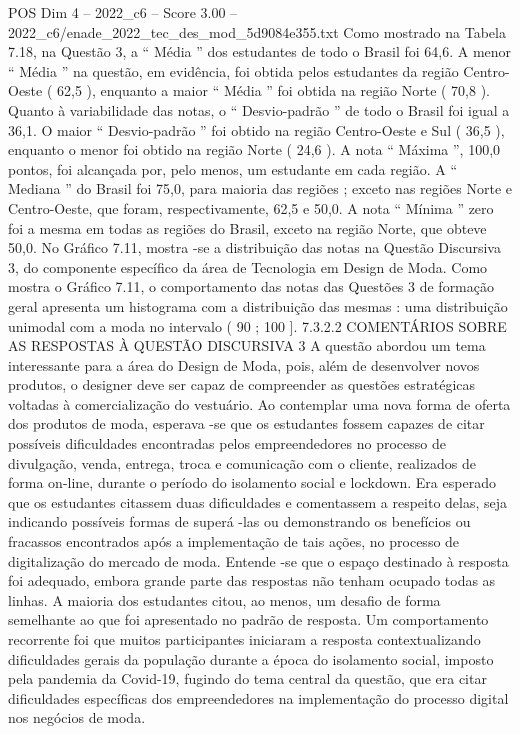\begin{textsample}{POS Dim 4 – 2022\_c6 – Score 3.00 – 2022\_c6/enade\_2022\_tec\_des\_mod\_5d9084e355.txt}
Como mostrado na Tabela 7.18, na Questão 3, a “ Média ” dos estudantes de todo o Brasil foi 64,6.
A menor “ Média ” na questão, em evidência, foi obtida pelos estudantes da região Centro-Oeste ( 62,5 ), enquanto a maior “ Média ” foi obtida na região Norte ( 70,8 ).
Quanto à variabilidade das notas, o “ Desvio-padrão ” de todo o Brasil foi igual a 36,1.
O maior “ Desvio-padrão ” foi obtido na região Centro-Oeste e Sul ( 36,5 ), enquanto o menor foi obtido na região Norte ( 24,6 ).
A nota “ Máxima ”, 100,0 pontos, foi alcançada por, pelo menos, um estudante em cada região.
A “ Mediana ” do Brasil foi 75,0, para maioria das regiões ; exceto nas regiões Norte e Centro-Oeste, que foram, respectivamente, 62,5 e 50,0.
A nota “ Mínima ” zero foi a mesma em todas as regiões do Brasil, exceto na região Norte, que obteve 50,0.
No Gráfico 7.11, mostra -se a distribuição das notas na Questão Discursiva 3, do componente específico da área de Tecnologia em Design de Moda.
Como mostra o Gráfico 7.11, o comportamento das notas das Questões 3 de formação geral apresenta um histograma com a distribuição das mesmas : uma distribuição unimodal com a moda no intervalo ( 90 ; 100 ]. 7.3.2.2 COMENTÁRIOS SOBRE AS RESPOSTAS À QUESTÃO DISCURSIVA 3 A questão abordou um tema interessante para a área do Design de Moda, pois, além de desenvolver novos produtos, o designer deve ser capaz de compreender as questões estratégicas voltadas à comercialização do vestuário.
Ao contemplar uma nova forma de oferta dos produtos de moda, esperava -se que os estudantes fossem capazes de citar possíveis dificuldades encontradas pelos empreendedores no processo de divulgação, venda, entrega, troca e comunicação com o cliente, realizados de forma on-line, durante o período do isolamento social e lockdown.
Era esperado que os estudantes citassem duas dificuldades e comentassem a respeito delas, seja indicando possíveis formas de superá -las ou demonstrando os benefícios ou fracassos encontrados após a implementação de tais ações, no processo de digitalização do mercado de moda.
Entende -se que o espaço destinado à resposta foi adequado, embora grande parte das respostas não tenham ocupado todas as linhas.
A maioria dos estudantes citou, ao menos, um desafio de forma semelhante ao que foi apresentado no padrão de resposta.
Um comportamento recorrente foi que muitos participantes iniciaram a resposta contextualizando dificuldades gerais da população durante a época do isolamento social, imposto pela pandemia da Covid-19, fugindo do tema central da questão, que era citar dificuldades específicas dos empreendedores na implementação do processo digital nos negócios de moda.

\end{textsample}
